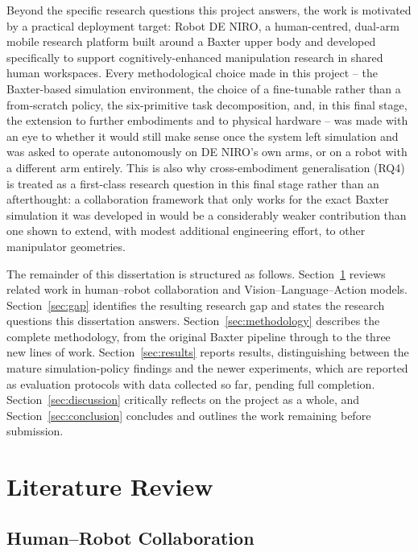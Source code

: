 \documentclass[12pt]{article}
\begin{document}
Beyond the specific research questions this project answers, the work is motivated by a practical deployment target: Robot DE NIRO, a human-centred, dual-arm mobile research platform built around a Baxter upper body and developed specifically to support cognitively-enhanced manipulation research in shared human workspaces. Every methodological choice made in this project -- the Baxter-based simulation environment, the choice of a fine-tunable rather than a from-scratch policy, the six-primitive task decomposition, and, in this final stage, the extension to further embodiments and to physical hardware -- was made with an eye to whether it would still make sense once the system left simulation and was asked to operate autonomously on DE NIRO's own arms, or on a robot with a different arm entirely. This is also why cross-embodiment generalisation (RQ4) is treated as a first-class research question in this final stage rather than an afterthought: a collaboration framework that only works for the exact Baxter simulation it was developed in would be a considerably weaker contribution than one shown to extend, with modest additional engineering effort, to other manipulator geometries.

The remainder of this dissertation is structured as follows. Section~\ref{sec:litrev} reviews related work in human--robot collaboration and Vision--Language--Action models. Section~\ref{sec:gap} identifies the resulting research gap and states the research questions this dissertation answers. Section~\ref{sec:methodology} describes the complete methodology, from the original Baxter pipeline through to the three new lines of work. Section~\ref{sec:results} reports results, distinguishing between the mature simulation-policy findings and the newer experiments, which are reported as evaluation protocols with data collected so far, pending full completion. Section~\ref{sec:discussion} critically reflects on the project as a whole, and Section~\ref{sec:conclusion} concludes and outlines the work remaining before submission.

\section{Literature Review}
\label{sec:litrev}

\subsection{Human--Robot Collaboration}
\end{document}
